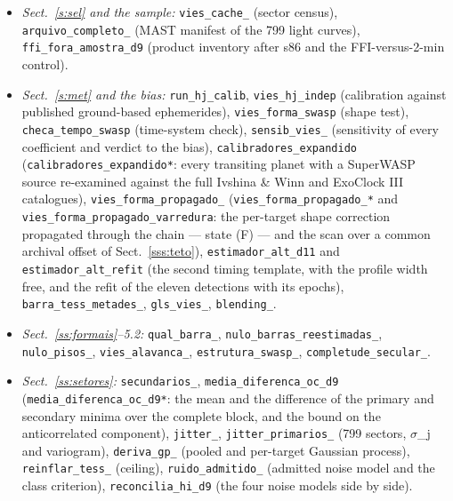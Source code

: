 \documentclass{aa}
\begin{document}
\begin{sloppypar}
\begin{itemize}
\item \textit{Sect.~\ref{s:sel} and the sample:} \texttt{vies\_\allowbreak cache\_} (sector census), \texttt{arquivo\_\allowbreak completo\_} (MAST manifest of the 799 light curves), \texttt{ffi\_\allowbreak fora\_\allowbreak amostra\_\allowbreak d9} (product inventory after s86 and the FFI-versus-2-min control).
\item \textit{Sect.~\ref{s:met} and the bias:} \texttt{run\_\allowbreak hj\_\allowbreak calib}, \texttt{vies\_\allowbreak hj\_\allowbreak indep} (calibration against published ground-based ephemerides), \texttt{vies\_\allowbreak forma\_\allowbreak swasp} (shape test), \texttt{checa\_\allowbreak tempo\_\allowbreak swasp} (time-system check), \texttt{sensib\_\allowbreak vies\_} (sensitivity of every coefficient and verdict to the bias), \texttt{calibradores\_\allowbreak expandido} (\texttt{calibradores\_\allowbreak expandido*}: every transiting planet with a SuperWASP source re-examined against the full Ivshina \& Winn and ExoClock III catalogues), \texttt{vies\_\allowbreak forma\_\allowbreak propagado\_} (\texttt{vies\_\allowbreak forma\_\allowbreak propagado\_*} and \texttt{vies\_\allowbreak forma\_\allowbreak propagado\_\allowbreak varredura}: the per-target shape correction propagated through the chain --- state (F) --- and the scan over a common archival offset of Sect.~\ref{sss:teto}), \texttt{estimador\_\allowbreak alt\_\allowbreak d11} and \texttt{estimador\_\allowbreak alt\_\allowbreak refit} (the second timing template, with the profile width free, and the refit of the eleven detections with its epochs), \texttt{barra\_\allowbreak tess\_\allowbreak metades\_}, \texttt{gls\_\allowbreak vies\_}, \texttt{blending\_}.
\item \textit{Sect.~\ref{ss:formais}--5.2:} \texttt{qual\_\allowbreak barra\_}, \texttt{nulo\_\allowbreak barras\_\allowbreak reestimadas\_}, \texttt{nulo\_\allowbreak pisos\_}, \texttt{vies\_\allowbreak alavanca\_}, \texttt{estrutura\_\allowbreak swasp\_}, \texttt{completude\_\allowbreak secular\_}.
\item \textit{Sect.~\ref{ss:setores}:} \texttt{secundarios\_}, \texttt{media\_\allowbreak diferenca\_\allowbreak oc\_\allowbreak d9} (\texttt{media\_\allowbreak diferenca\_\allowbreak oc\_\allowbreak d9*}: the mean and the difference of the primary and secondary minima over the complete block, and the bound on the anticorrelated component), \texttt{jitter\_}, \texttt{jitter\_\allowbreak primarios\_} (799 sectors, $\sigma$\_j and variogram), \texttt{deriva\_\allowbreak gp\_} (pooled and per-target Gaussian process), \texttt{reinflar\_\allowbreak tess\_} (ceiling), \texttt{ruido\_\allowbreak admitido\_} (admitted noise model and the class criterion), \texttt{reconcilia\_\allowbreak hi\_\allowbreak d9} (the four noise models side by side).

\end{itemize}
\end{sloppypar}
\end{document}
